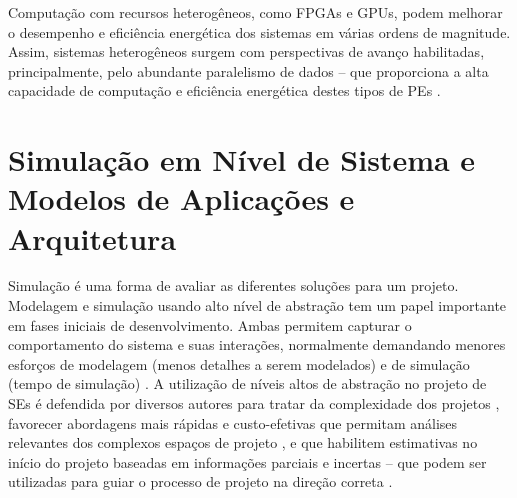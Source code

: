 \documentclass[tese-proposta,nocipinfo]{texufpel}
\begin{document}
Computação com recursos heterogêneos, como FPGAs e GPUs, podem melhorar o desempenho e eficiência energética dos sistemas em várias ordens de magnitude. Assim, sistemas heterogêneos surgem com perspectivas de avanço habilitadas, principalmente, pelo abundante paralelismo de dados -- que proporciona a alta capacidade de computação e eficiência energética destes tipos de PEs \cite{rogers2013heterogeneous,durelli2014runtime,waidyasooriya2018design}.



\section{Simulação em Nível de Sistema e Modelos de Aplicações e Arquitetura}
Simulação é uma forma de avaliar as diferentes soluções para um projeto. Modelagem e simulação usando alto nível de abstração tem um papel importante em fases iniciais de desenvolvimento. Ambas permitem capturar o comportamento do sistema e suas interações, normalmente demandando menores esforços de modelagem (menos detalhes a serem modelados) e de simulação (tempo de simulação) \cite{erbas2007framework}. A utilização de níveis altos de abstração no projeto de SEs é defendida por diversos autores para tratar da complexidade dos projetos \cite{Leite2016}, favorecer abordagens mais rápidas e custo-efetivas que permitam análises relevantes dos complexos espaços de projeto \cite{An2015172}, e que habilitem estimativas no início do projeto baseadas em informações parciais e incertas -- que podem ser utilizadas para guiar o processo de projeto na direção correta \cite{Hendriks2016}. 
\end{document}
